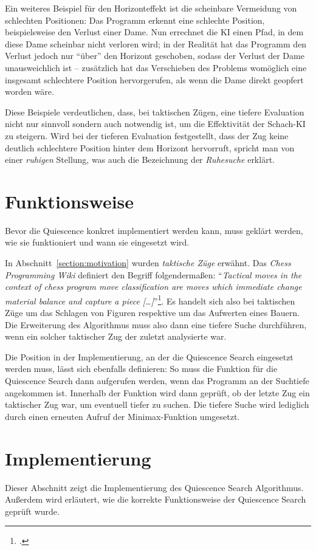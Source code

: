 Ein weiteres Beispiel für den Horizonteffekt ist die scheinbare Vermeidung von schlechten Positionen: Das Programm erkennt eine schlechte Position, beispielsweise den Verlust einer Dame. Nun errechnet die KI einen Pfad, in dem diese Dame scheinbar nicht verloren wird; in der Realität hat das Programm den Verlust jedoch nur "`über"' den Horizont geschoben, sodass der Verlust der Dame unausweichlich ist -- zusätzlich hat das Verschieben des Problems womöglich eine insgesamt schlechtere Position hervorgerufen, als wenn die Dame direkt geopfert worden wäre.

Diese Beispiele verdeutlichen, dass, bei taktischen Zügen, eine tiefere Evaluation nicht nur sinnvoll sondern auch notwendig ist, um die Effektivität der Schach-KI zu steigern. Wird bei der tieferen Evaluation festgestellt, dass der Zug keine deutlich schlechtere Position hinter dem Horizont hervorruft, spricht man von einer \textit{ruhigen} Stellung, was auch die Bezeichnung der \textit{Ruhesuche} erklärt.

\section{Funktionsweise}
Bevor die Quiescence konkret implementiert werden kann, muss geklärt werden, wie sie funktioniert und wann sie eingesetzt wird.

In Abschnitt~\ref{section:motivation} wurden \textit{taktische Züge} erwähnt. Das \textit{Chess Programming Wiki} definiert den Begriff folgendermaßen: "`\textit{Tactical moves in the context of chess program move classification are moves which immediate change material balance and capture a piece […]}"'\footcite{chessprogramming}. Es handelt sich also bei taktischen Züge um das Schlagen von Figuren respektive um das Aufwerten eines Bauern. Die Erweiterung des Algorithmus muss also dann eine tiefere Suche durchführen, wenn ein solcher taktischer Zug der zuletzt analysierte war. 

Die Position in der Implementierung, an der die Quiescence Search eingesetzt werden muss, lässt sich ebenfalls definieren: So muss die Funktion für die Quiescence Search dann aufgerufen werden, wenn das Programm an der Suchtiefe angekommen ist. Innerhalb der Funktion wird dann geprüft, ob der letzte Zug ein taktischer Zug war, um eventuell tiefer zu suchen. Die tiefere Suche wird lediglich durch einen erneuten Aufruf der Minimax-Funktion umgesetzt.

\section{Implementierung}
Dieser Abschnitt zeigt die Implementierung des Quiescence Search Algorithmus. Außerdem wird erläutert, wie die korrekte Funktionsweise der Quiescence Search geprüft wurde.

